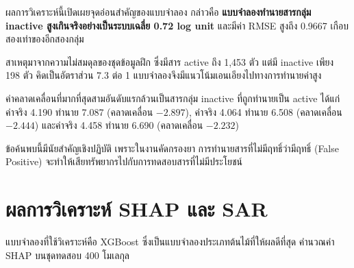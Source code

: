 ผลการวิเคราะห์นี้เปิดเผยจุดอ่อนสำคัญของแบบจำลอง กล่าวคือ \textbf{แบบจำลองทำนายสารกลุ่ม inactive สูงเกินจริงอย่างเป็นระบบเฉลี่ย 0.72 log unit} และมีค่า RMSE สูงถึง 0.9667 เกือบสองเท่าของอีกสองกลุ่ม

สาเหตุมาจากความไม่สมดุลของชุดข้อมูลฝึก ซึ่งมีสาร active ถึง 1{,}453 ตัว แต่มี inactive เพียง 198 ตัว คิดเป็นอัตราส่วน 7.3 ต่อ 1 แบบจำลองจึงมีแนวโน้มเอนเอียงไปทางการทำนายค่าสูง

ค่าคลาดเคลื่อนที่มากที่สุดสามอันดับแรกล้วนเป็นสารกลุ่ม inactive ที่ถูกทำนายเป็น active ได้แก่ ค่าจริง 4.190 ทำนาย 7.087 (คลาดเคลื่อน $-2.897$), ค่าจริง 4.064 ทำนาย 6.508 (คลาดเคลื่อน $-2.444$) และค่าจริง 4.458 ทำนาย 6.690 (คลาดเคลื่อน $-2.232$)

ข้อค้นพบนี้มีนัยสำคัญเชิงปฏิบัติ เพราะในงานคัดกรองยา การทำนายสารที่ไม่มีฤทธิ์ว่ามีฤทธิ์ (False Positive) จะทำให้เสียทรัพยากรไปกับการทดสอบสารที่ไม่มีประโยชน์

\section{ผลการวิเคราะห์ SHAP และ SAR}

แบบจำลองที่ใช้วิเคราะห์คือ XGBoost ซึ่งเป็นแบบจำลองประเภทต้นไม้ที่ให้ผลดีที่สุด คำนวณค่า SHAP บนชุดทดสอบ 400 โมเลกุล

